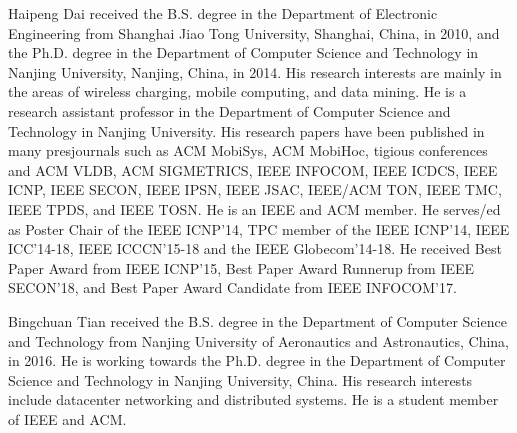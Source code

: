 \documentclass[10pt,journal,compsoc]{IEEEtran}
\begin{document}
\begin{IEEEbiography}{Haipeng Dai} 
received the B.S. degree in the Department of Electronic Engineering from Shanghai Jiao Tong University, Shanghai, China, in 2010, and the Ph.D. degree in the Department of Computer Science and Technology in Nanjing University, Nanjing, China, in 2014. His research interests are mainly in the areas of wireless charging, mobile computing, and data mining. He is a research assistant professor in the Department of Computer Science and Technology in Nanjing University. His research papers have been published in many presjournals such as ACM MobiSys, ACM MobiHoc, tigious conferences and ACM VLDB, ACM SIGMETRICS, IEEE INFOCOM, IEEE ICDCS, IEEE ICNP, IEEE SECON, IEEE IPSN, IEEE JSAC, IEEE/ACM TON, IEEE TMC, IEEE TPDS, and IEEE TOSN. He is an IEEE and ACM member. He serves/ed as Poster Chair of the IEEE ICNP'14, TPC member of the IEEE ICNP'14, IEEE ICC'14-18, IEEE ICCCN'15-18 and the IEEE Globecom'14-18. He received Best Paper Award from IEEE ICNP'15, Best Paper Award Runnerup from IEEE SECON'18, and Best Paper Award Candidate from IEEE INFOCOM'17.
\end{IEEEbiography}

\begin{IEEEbiography}{Bingchuan Tian} 
received the B.S. degree in the Department of Computer Science and Technology from Nanjing University of Aeronautics and Astronautics, China, in 2016. He is working towards the Ph.D. degree in the Department of Computer Science and Technology in Nanjing University, China. His research interests include datacenter networking and distributed systems. He is a student member of IEEE and ACM.
\end{IEEEbiography}
\end{document}
